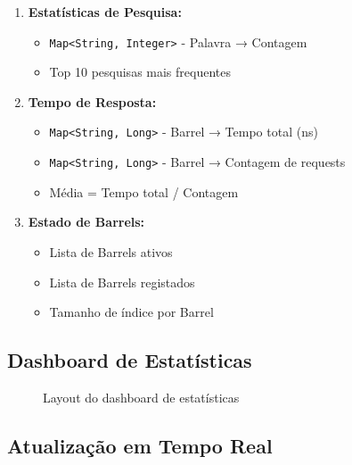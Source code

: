 \documentclass[12pt,a4paper]{article}
\begin{document}
\begin{enumerate}
    \item \textbf{Estatísticas de Pesquisa:}
    \begin{itemize}
        \item \texttt{Map<String, Integer>} - Palavra → Contagem
        \item Top 10 pesquisas mais frequentes
    \end{itemize}
    
    \item \textbf{Tempo de Resposta:}
    \begin{itemize}
        \item \texttt{Map<String, Long>} - Barrel → Tempo total (ns)
        \item \texttt{Map<String, Long>} - Barrel → Contagem de requests
        \item Média = Tempo total / Contagem
    \end{itemize}
    
    \item \textbf{Estado de Barrels:}
    \begin{itemize}
        \item Lista de Barrels ativos
        \item Lista de Barrels registados
        \item Tamanho de índice por Barrel
    \end{itemize}
\end{enumerate}

\subsection{Dashboard de Estatísticas}

\begin{figure}[H]
\centering
{}
\caption{Layout do dashboard de estatísticas}
\end{figure}

\subsection{Atualização em Tempo Real}
\end{document}
